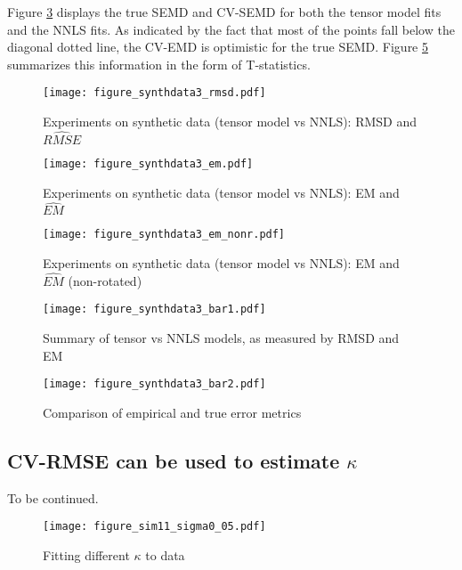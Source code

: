\documentclass[11pt]{article}
\begin{document}
Figure \ref{fig:s3emnr} displays the true SEMD and CV-SEMD for both the
tensor model fits and the NNLS fits.
As indicated by the fact that most of the points fall below the
diagonal dotted line, the CV-EMD is optimistic for the true SEMD.
Figure \ref{fig:s3bar2} summarizes this information in the form of
T-statistics.


\newpage
\begin{figure}[h]
\hspace{-50pt}
\texttt{[image: figure\_synthdata3\_rmsd.pdf]}
\caption{Experiments on synthetic data (tensor model vs NNLS):
  RMSD and $\hat{RMSE}$}
\label{fig:s3rmsd}
\end{figure}

\newpage
\begin{figure}[h]
\hspace{-50pt}
\texttt{[image: figure\_synthdata3\_em.pdf]}
\caption{Experiments on synthetic data (tensor model vs NNLS):
  EM and $\hat{EM}$}
\label{fig:s3em}
\end{figure}

\newpage
\begin{figure}[h]
\hspace{-50pt}
\texttt{[image: figure\_synthdata3\_em\_nonr.pdf]}
\caption{Experiments on synthetic data (tensor model vs NNLS):
EM and $\hat{EM}$ (non-rotated)}
\label{fig:s3emnr}
\end{figure}

\newpage
\begin{figure}[h]
\hspace{-50pt}
\texttt{[image: figure\_synthdata3\_bar1.pdf]}
\caption{Summary of tensor vs NNLS models, as measured by RMSD
  and EM}
\label{fig:s3bar1}
\end{figure}

\newpage
\begin{figure}[h]
\hspace{-50pt}
\texttt{[image: figure\_synthdata3\_bar2.pdf]}
\caption{Comparison of empirical and true error metrics}
\label{fig:s3bar2}
\end{figure}

\newpage

\subsection{CV-RMSE can be used to estimate $\kappa$}

To be continued.

\begin{figure}[h]
\centering
\texttt{[image: figure\_sim11\_sigma0\_05.pdf]}
\caption{Fitting different $\kappa$ to data}
\label{fig:fitkappa}
\end{figure}



\end{document}
